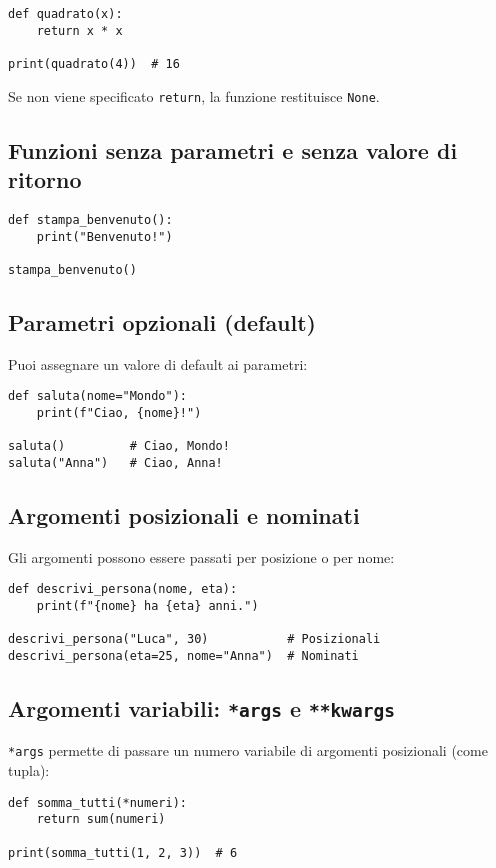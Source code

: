 \documentclass[a4paper,12pt]{article}
\begin{document}
\begin{lstlisting}
def quadrato(x):
    return x * x

print(quadrato(4))  # 16
\end{lstlisting}

Se non viene specificato \texttt{return}, la funzione restituisce \texttt{None}.

\subsection*{Funzioni senza parametri e senza valore di ritorno}
\begin{lstlisting}
def stampa_benvenuto():
    print("Benvenuto!")

stampa_benvenuto()
\end{lstlisting}

\subsection*{Parametri opzionali (default)}
Puoi assegnare un valore di default ai parametri:

\begin{lstlisting}
def saluta(nome="Mondo"):
    print(f"Ciao, {nome}!")

saluta()         # Ciao, Mondo!
saluta("Anna")   # Ciao, Anna!
\end{lstlisting}

\subsection*{Argomenti posizionali e nominati}
Gli argomenti possono essere passati per posizione o per nome:

\begin{lstlisting}
def descrivi_persona(nome, eta):
    print(f"{nome} ha {eta} anni.")

descrivi_persona("Luca", 30)           # Posizionali
descrivi_persona(eta=25, nome="Anna")  # Nominati
\end{lstlisting}

\subsection*{Argomenti variabili: \texttt{*args} e \texttt{**kwargs}}
\texttt{*args} permette di passare un numero variabile di argomenti posizionali (come tupla):

\begin{lstlisting}
def somma_tutti(*numeri):
    return sum(numeri)

print(somma_tutti(1, 2, 3))  # 6
\end{lstlisting}
\end{document}
